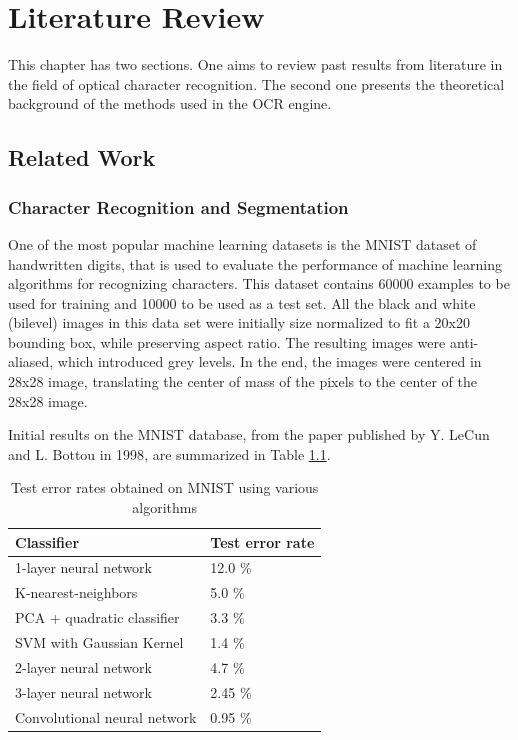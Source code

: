 \chapter{Literature Review}
\label{chap:lit_rev}
This chapter has two sections. One aims to review past results from literature in the field of optical character recognition. The second one presents the theoretical background of the methods used in the OCR engine. 

\section{Related Work}
\subsection{Character Recognition and Segmentation}
One of the most popular machine learning datasets is the MNIST dataset of handwritten digits\cite{lecun1998mnist}, that is used to evaluate the performance of machine learning algorithms for recognizing characters. This dataset contains 60000 examples to be used for training and 10000 to be used as a test set. All the black and white (bilevel) images in this data set were initially size normalized to fit a 20x20 bounding box, while preserving aspect ratio. The resulting images were anti-aliased, which introduced grey levels. In the end, the images were centered in 28x28 image, translating the center of mass of the pixels to the center of the 28x28 image. 

Initial results on the MNIST database, from the paper published by Y. LeCun and L. Bottou in 1998\cite{Lecun_1998}, are summarized in Table \ref{table:mnist_results}. 

\begin{table}[h]
\caption{Test error rates obtained on MNIST using various algorithms}
\label{table:mnist_results}
\begin{tabular}{ll}
\hline
Classifier                   & Test error rate \\ \hline
1-layer neural network       & 12.0 \%           \\
K-nearest-neighbors          & 5.0  \%           \\
PCA + quadratic classifier   & 3.3  \%          \\
SVM with Gaussian Kernel     & 1.4  \%           \\
2-layer neural network       & 4.7  \%           \\
3-layer neural network       & 2.45 \%           \\
Convolutional neural network & 0.95 \%           \\ \hline
\end{tabular}
\end{table}

